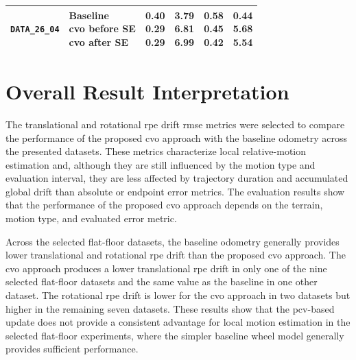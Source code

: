 \documentclass[report.tex]{subfiles}
\begin{document}
\begin{table}[!htbp]
\begin{tabularx}{\textwidth}{
        >{\raggedright\arraybackslash}m{2.0cm}
        >{\raggedright\arraybackslash}m{2.1cm}
        cccc
    }
        \texttt{DATA\_26\_04}
        &
        \makecell[l]{
            Baseline\\
            \gls{cvo} before SE\\
            \gls{cvo} after SE
        }
        &
        \makecell{
            0.40\\
            \textbf{0.29}\\
            \textbf{0.29}
        }
        &
        \makecell{
            \textbf{3.79}\\
            6.81\\
            6.99
        }
        &
        \makecell{
            0.58\\
            0.45\\
            \textbf{0.42}
        }
        &
        \makecell{
            \textbf{0.44}\\
            5.68\\
            5.54
        }
        \\

        \bottomrule
    \end{tabularx}
\end{table}

    \section{Overall Result Interpretation}

        The translational and rotational \gls{rpe} drift \gls{rmse} metrics were selected to compare the performance of the proposed \gls{cvo} approach with the baseline odometry across the presented datasets. These metrics characterize local relative-motion estimation and, although they are still influenced by the motion type and evaluation interval, they are less affected by trajectory duration and accumulated global drift than absolute or endpoint error metrics. The evaluation results show that the performance of the proposed \gls{cvo} approach depends on the terrain, motion type, and evaluated error metric.

        Across the selected flat-floor datasets, the baseline odometry generally provides lower translational and rotational \gls{rpe} drift than the proposed \gls{cvo} approach. The \gls{cvo} approach produces a lower translational \gls{rpe} drift in only one of the nine selected flat-floor datasets and the same value as the baseline in one other dataset. The rotational \gls{rpe} drift is lower for the \gls{cvo} approach in two datasets but higher in the remaining seven datasets. These results show that the \gls{pcv}-based update does not provide a consistent advantage for local motion estimation in the selected flat-floor experiments, where the simpler baseline wheel model generally provides sufficient performance.
\end{document}
